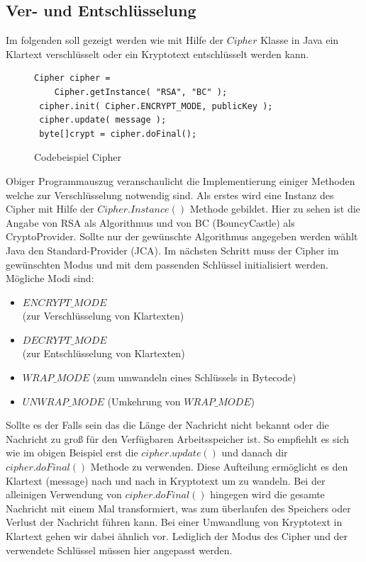 \documentclass[paper=a4,11pt,german]{scrartcl} %
\begin{document}
\subsection{Ver- und Entschlüsselung}
Im folgenden soll gezeigt werden wie mit Hilfe der $Cipher$ Klasse in Java ein Klartext verschlüsselt oder ein Kryptotext entschlüsselt werden kann.
\begin{figure}[h]
\caption{Codebeispiel Cipher}
\begin{lstlisting}[frame=shadowbox]
 Cipher cipher = 
 	Cipher.getInstance( "RSA", "BC" );
 cipher.init( Cipher.ENCRYPT_MODE, publicKey );
 cipher.update( message );
 byte[]crypt = cipher.doFinal();
\end{lstlisting}
\label{encrypt}
\end{figure}
Obiger Programmauszug veranschaulicht die Implementierung einiger Methoden welche zur Verschlüsselung notwendig sind. Als erstes wird eine Instanz des Cipher mit Hilfe der $Cipher.Instance()$ Methode gebildet. Hier zu sehen ist die Angabe von RSA als Algorithmus und von BC (BouncyCastle) als CryptoProvider. Sollte nur der gewünschte Algorithmus angegeben werden wählt Java den Standard-Provider (JCA). Im nächsten Schritt muss der Cipher im gewünschten Modus und mit dem passenden Schlüssel initialisiert werden.\\
Mögliche Modi sind:
\begin{itemize}
\item $ENCRYPT\_MODE$\\(zur Verschlüsselung von Klartexten)
\item  $DECRYPT\_MODE$\\
(zur Entschlüsselung von Klartexten)
\item $WRAP\_MODE$
(zum umwandeln eines Schlüssels in Bytecode)
\item $UNWRAP\_MODE$
(Umkehrung von $WRAP\_MODE$)
\end{itemize}
Sollte es der Falls sein das die Länge der Nachricht nicht bekannt oder die Nachricht zu groß für den Verfügbaren Arbeitsspeicher ist. So empfiehlt es sich wie im obigen Beispiel erst die $cipher.update()$ und danach dir $cipher.doFinal()$ Methode zu verwenden. Diese Aufteilung ermöglicht es den Klartext (message) nach und nach in Kryptotext um zu wandeln. Bei der alleinigen Verwendung von $cipher.doFinal()$ hingegen wird die gesamte Nachricht mit einem Mal transformiert, was zum überlaufen des Speichers oder Verlust der Nachricht führen kann.
Bei einer Umwandlung von Kryptotext in Klartext gehen wir dabei ähnlich vor. Lediglich der Modus des Cipher und der verwendete Schlüssel müssen hier angepasst werden.  
\end{document}
